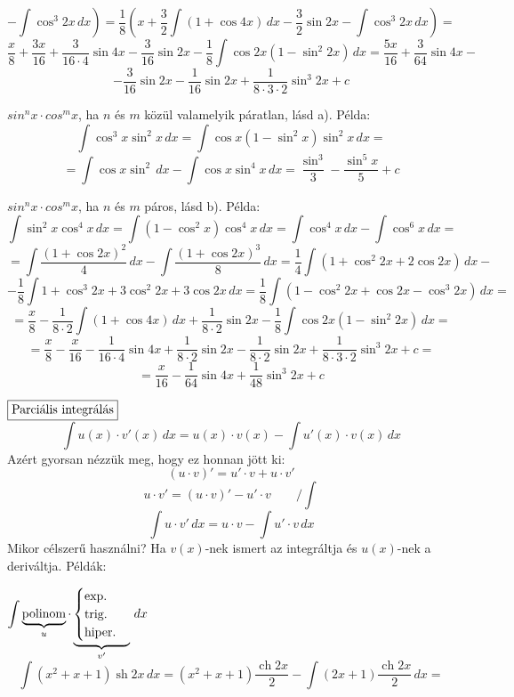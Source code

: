 \documentclass[a4paper,12pt,twoside]{book}
\DeclareMathOperator{\sh}{sh} %
\DeclareMathOperator{\ch}{ch} %
\theoremstyle{break}
\theoremstyle{plain}
\newcommand{\integ}[1]{\ensuremath{\int #1\, dx}}
\begin{document}
\begin{list}{.}{\leftmargin=1.5em}
\begin{list}{)}{\leftmargin=1.5em}
    \[\left. - \integ{\cos^3 2x}\right) =  \frac{1}{8}\left(x+\frac{3}{2}\integ{(1+\cos 4x)} -\frac{3}{2}\sin 2x -\integ{\cos^3 2x} \right) = \]
    \[\frac{x}{8}+\frac{3x}{16}+\frac{3}{16\cdot 4}\sin 4x -\frac{3}{16}\sin 2x -\frac{1}{8}\integ{\cos 2x(1-\sin^2 2x)} = \frac{5x}{16}+\frac{3}{64}\sin 4x -\]
    \[-\frac{3}{16}\sin 2x-\frac{1}{16}\sin 2x+\frac{1}{8\cdot 3\cdot 2}\sin^3 2x + c\]
    \item $sin^n x\cdot cos^m x$, ha $n$ és $m$ közül valamelyik páratlan, lásd a). Példa:
    \[\integ{\cos^3 x\sin^2 x} = \integ{\cos x(1-\sin^2 x)\sin^2 x} = \]
    \[= \integ{\cos x\sin^2}- \integ{\cos x\sin^4 x} = \frac{\sin^3}{3}-\frac{\sin^5 x}{5} + c\]
    \item $sin^n x\cdot cos^m x$, ha $n$ és $m$ páros, lásd b). Példa:
    \[\integ{\sin^2 x\cos^4 x} = \integ{(1-\cos^2 x)\cos^4 x} = \integ{\cos^4 x}-\integ{\cos^6 x} = \]
    \[ = \integ{\frac{(1+\cos 2x)^2}{4}}-\integ{\frac{(1+\cos 2x)^3}{8}} = \frac{1}{4}\integ{\left(1+\cos^2 2x+2\cos 2x\right)}-\]
    \[-\frac{1}{8}\integ{1+\cos^3 2x+3\cos^2 2x+3\cos 2x} = \frac{1}{8}\integ{\left(1-\cos^2 2x+\cos 2x-\cos^3 2x\right)} =\]
    \[= \frac{x}{8}-\frac{1}{8\cdot 2}\integ{(1+\cos 4x)}+\frac{1}{8\cdot 2}\sin 2x-\frac{1}{8}\integ{\cos 2x(1-\sin^2 2x)} = \]
    \[= \frac{x}{8}-\frac{x}{16}-\frac{1}{16\cdot 4}\sin 4x+\frac{1}{8\cdot 2}\sin 2x-\frac{1}{8\cdot 2}\sin 2x+\frac{1}{8\cdot 3\cdot 2}\sin^3 2x + c = \]
    \[= \frac{x}{16} -\frac{1}{64}\sin 4x+\frac{1}{48}\sin^3 2x + c\]
  \end{list}
 \item $\boxed{$Parciális integrálás$}$\\[+3pt]
  \[\boxed{\integ{u(x)\cdot v'(x)} = u(x)\cdot v(x)-\integ{u'(x)\cdot v(x)}}\]
  Azért gyorsan nézzük meg, hogy ez honnan jött ki:
    \[(u\cdot v)' = u'\cdot v+u\cdot v'\]
    \[u\cdot v' = (u\cdot v)'-u'\cdot v \qquad /\textstyle\int\]
    \[\integ{u\cdot v'} = u\cdot v-\integ{u'\cdot v}\]
  Mikor célszerű használni? Ha $v(x)$-nek ismert az integráltja és $u(x)$-nek a deriváltja. Példák:
  \begin{list}{)}{\leftmargin=1.5em}
    \item $\displaystyle \integ{\underbrace{\hbox{polinom}}_{u}\cdot\underbrace{\begin{cases}\hbox{exp.}\\\hbox{trig.}\\\hbox{hiper.}\end{cases}}_{v'}}$
      \[\integ{(x^2+x+1)\sh 2x} = (x^2+x+1)\frac{\ch 2x}{2}-\integ{(2x+1)\frac{\ch 2x}{2}} = \]

\end{list}
\end{list}
\end{document}
